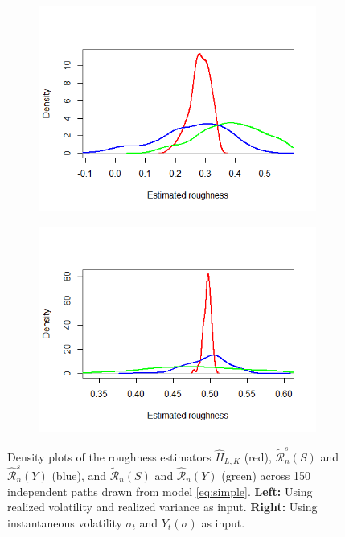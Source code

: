 \documentclass{article}
\begin{document}
\begin{figure}[htbp]
    \centering
    
    \begin{subfigure}{0.48\textwidth}
        \includegraphics[width=\linewidth]{ex5_densRV.png}
    \end{subfigure}
    \hfill
    \begin{subfigure}{0.48\textwidth}
        \includegraphics[width=\linewidth]{ex5_densIV.png}
    \end{subfigure}
    
    \caption{Density plots of the roughness estimators $\widehat{H}_{L,K}$ (red), $\widetilde{\mathscr{R}}_n^s(S)$ and $\widehat{\mathscr{R}}_n^s(Y)$ (blue), and $\widetilde{\mathscr{R}}_n(S)$ and $\widehat{\mathscr{R}}_n(Y)$ (green) across 150 independent paths drawn from model \eqref{eq:simple}. \textbf{Left:} Using realized volatility and realized variance as input. \textbf{Right:} Using instantaneous volatility $\sigma_t$ and $Y_t(\sigma)$ as input.}
    \label{fig:ex5dens}
\end{figure}\\\\
\end{document}
